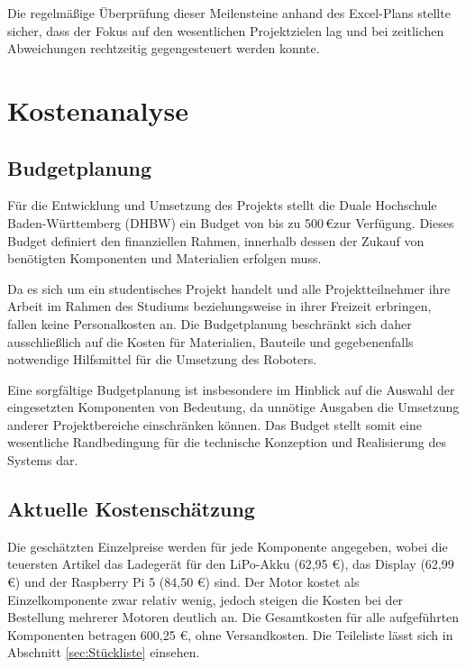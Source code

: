Die regelmäßige Überprüfung dieser Meilensteine anhand des Excel-Plans stellte sicher, dass der Fokus auf den wesentlichen Projektzielen lag und bei zeitlichen Abweichungen rechtzeitig gegengesteuert werden konnte.

\section{Kostenanalyse}
\label{cha:Kostenanalyse}

\subsection{Budgetplanung}
\label{cha:Budgetplanung}

Für die Entwicklung und Umsetzung des Projekts stellt die Duale Hochschule Baden-Württemberg (DHBW) ein Budget von bis zu \num{500}\,\euro\;zur Verfügung. Dieses Budget definiert den finanziellen Rahmen, innerhalb dessen der Zukauf von benötigten Komponenten und Materialien erfolgen muss.

Da es sich um ein studentisches Projekt handelt und alle Projektteilnehmer ihre Arbeit im Rahmen des Studiums beziehungsweise in ihrer Freizeit erbringen, fallen keine Personalkosten an. Die Budgetplanung beschränkt sich daher ausschließlich auf die Kosten für Materialien, Bauteile und gegebenenfalls notwendige Hilfsmittel für die Umsetzung des Roboters.

Eine sorgfältige Budgetplanung ist insbesondere im Hinblick auf die Auswahl der eingesetzten Komponenten von Bedeutung, da unnötige Ausgaben die Umsetzung anderer Projektbereiche einschränken können. Das Budget stellt somit eine wesentliche Randbedingung für die technische Konzeption und Realisierung des Systems dar.

\subsection{Aktuelle Kostenschätzung}
\label{cha:Aktuelle Kostenschätzung}

Die geschätzten Einzelpreise werden für jede Komponente angegeben, wobei die teuersten Artikel das Ladegerät für den LiPo-Akku (62,95 €), das Display (62,99 €) und der Raspberry Pi 5 (84,50 €) sind. Der Motor kostet als Einzelkomponente zwar relativ wenig, jedoch steigen die Kosten bei der Bestellung mehrerer Motoren deutlich an. Die Gesamtkosten für alle aufgeführten Komponenten betragen 600,25 €, ohne Versandkosten. Die Teileliste lässt sich in Abschnitt \ref{sec:Stückliste} einsehen.

